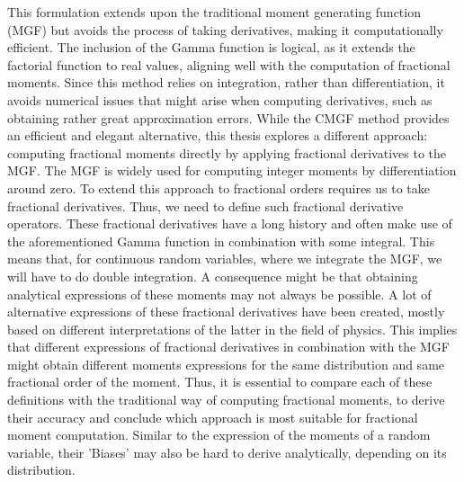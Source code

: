 This formulation extends upon the traditional moment generating function (MGF) but avoids the process of taking derivatives, making it computationally efficient. The inclusion of the Gamma function is logical, as it extends the factorial function to real values, aligning well with the computation of fractional moments. Since this method relies on integration, rather than differentiation, it avoids numerical issues that might arise when computing derivatives, such as obtaining rather great approximation errors.
While the CMGF method provides an efficient  and elegant alternative, this thesis explores a different approach: computing fractional moments directly by applying fractional derivatives to the MGF. The MGF is widely used for computing integer moments by differentiation around zero. To extend this approach to fractional orders requires us to take fractional derivatives. Thus, we need to define such fractional derivative operators. These fractional derivatives have a long history and often make use of the aforementioned Gamma function in combination with some integral. This means that, for continuous random variables, where we integrate the MGF, we will have to do double integration. A consequence might be that obtaining analytical expressions of these moments may not always be possible. A lot of alternative expressions of these fractional derivatives have been created, mostly based on different interpretations of the latter in the field of physics. This implies that different expressions of fractional derivatives in combination with the MGF might obtain different  moments expressions for the same distribution and same fractional order of the moment. Thus, it is essential to compare each of these definitions with the traditional way of computing fractional moments, to derive their accuracy and conclude which approach is most suitable for fractional moment computation. Similar to the expression of the moments of a random variable, their 'Biases' may also be hard to derive analytically, depending on its distribution.



